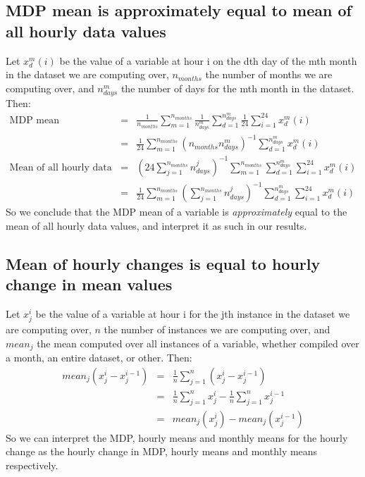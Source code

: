 \subsection[MDP mean vs mean of hourly data]{MDP mean is approximately equal to mean of all hourly data values}
\label{ssec:mean_commute}

Let $x^m_d(i)$ be the value of a variable at hour i on the dth day of the mth month in the dataset we are computing over, $n_{months}$ the number of months we are computing over, and $n^m_{days}$ the number of days for the mth month in the dataset. Then:
\begin{eqnarray}
	\mbox{MDP mean} &=& \frac{1}{n_{months}} \sum_{m=1}^{n_{months}} \frac{1}{n^m_{days}} \sum_{d=1}^{n^m_{days}} \frac{1}{24} \sum_{i=1}^{24} x^m_d (i) \\
	&=& \frac{1}{24} \sum_{m=1}^{n_{months}} (n_{months} n^m_{days})^{-1} \sum_{d=1}^{n^m_{days}} x^m_d (i) \nonumber \\
	\mbox{Mean of all hourly data values} &=& \left(24 \sum_{j=1}^{n_{months}} n^j_{days} \right)^{-1} \sum_{m=1}^{n_{months}} \sum_{d=1}^{n^m_{days}} \sum_{i=1}^{24} x^m_d (i) \\
	&=& \frac{1}{24} \sum_{m=1}^{n_{months}} \left( \sum_{j=1}^{n_{months}} n^j_{days} \right)^{-1} \sum_{d=1}^{n^m_{days}} \sum_{i=1}^{24} x^m_d (i) \nonumber
\end{eqnarray}
So we conclude that the \ac{MDP} mean of a variable is \textit{approximately} equal to the mean of all hourly data values, and interpret it as such in our results.

\subsection[Mean of hourly change vs hourly change in mean]{Mean of hourly changes is equal to hourly change in mean values}

Let $x^i_j$ be the value of a variable at hour i for the jth instance in the dataset we are computing over, $n$ the number of instances we are computing over, and $mean_j$ the mean computed over all instances of a variable, whether compiled over a month, an entire dataset, or other. Then:
\begin{eqnarray}
	mean_j(x^i_j - x^{i-1}_j) &=& \frac{1}{n} \sum_{j=1}^{n} (x^i_j - x^{i-1}_j) \\
	&=& \frac{1}{n} \sum_{j=1}^{n} x^i_j - \frac{1}{n} \sum_{j=1}^{n} x^{i-1}_j \nonumber \\
	&=& mean_j(x^i_j) - mean_j(x^{i-1}_j) \nonumber
\end{eqnarray}
So we can interpret the \ac{MDP}, hourly means and monthly means for the hourly change as the hourly change in \ac{MDP}, hourly means and monthly means respectively.

